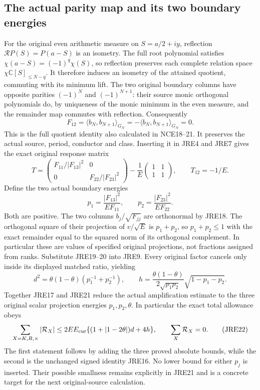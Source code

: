 \subsection{The actual parity map and its two boundary energies}
For the original even arithmetic measure on $S=a/2+iy$, reflection
$\mathcal R P(S)=P(a-S)$ is an isometry. The full root polynomial
satisfies $\chi(a-S)=(-1)^q\chi(S)$, so reflection preserves each
complete relation space $\chi\mathbb C[S]_{\le N-q}$. It therefore
induces an isometry of the attained quotient, commuting with its
minimum lift. The two original boundary columns have opposite
parities $(-1)^N$ and $(-1)^{N+1}$: their source monic orthogonal
polynomials do, by uniqueness of the monic minimum in the even
measure, and the remainder map commutes with reflection. Consequently
\[
 F_{12}=\langle b_N,b_{N+1}\rangle_{G_N}
       =-\langle b_N,b_{N+1}\rangle_{G_N}=0 .                   \tag{JRE18}
\]
This is the full quotient identity also calculated in NCE18--21.
It preserves the actual source, period, conductor and class. Inserting
it in JRE4 and JRE7 gives the exact original response matrix
\[
 T=\begin{pmatrix}F_{11}/|F_{13}|^2&0\\0&F_{22}/|F_{23}|^2\end{pmatrix}
       -\frac1E\begin{pmatrix}1&1\\1&1\end{pmatrix},\qquad
 T_{12}=-1/E .                                                \tag{JRE19}
\]
Define the two actual boundary energies
\[
 p_1=\frac{|F_{13}|^2}{EF_{11}},\qquad
 p_2=\frac{|F_{23}|^2}{EF_{22}}.                              \tag{JRE20}
\]
Both are positive. The two columns $b_j/\sqrt{F_{jj}}$ are
orthonormal by JRE18. The orthogonal square of their projection
of $v/\sqrt E$ is $p_1+p_2$, so $p_1+p_2\le1$ with the exact
remainder equal to the squared norm of its orthogonal complement.
In particular these are values of specified original projections,
not fractions assigned from ranks.
Substitute JRE19--20 into JRE9. Every original factor cancels
only inside its displayed matched ratio, yielding
\[
 \boxed{d^2=\theta(1-\theta)(p_1^{-1}+p_2^{-1}),\qquad
 h=\frac{\theta(1-\theta)}{2\sqrt{p_1p_2}}
                    \sqrt{1-p_1-p_2}.}                       \tag{JRE21}
\]
Together JRE17 and JRE21 reduce the actual amplification estimate
to the three original scalar projection energies
$p_1,p_2,\theta$. In particular the exact total allowance obeys
\[
 \sum_{X=K,B,\times}|\mathcal R_X|
 \le2EE_{\rm cur}\{(1+|1-2\theta|)d+4h\},\qquad
 \sum_X\mathcal R_X=0.                                      \tag{JRE22}
\]
The first statement follows by adding the three proved absolute
bounds, while the second is the unchanged signed identity JRE16.
No lower bound for either $p_j$ is inserted. Their possible smallness
remains explicitly in JRE21 and is a concrete target for the next
original-source calculation.

